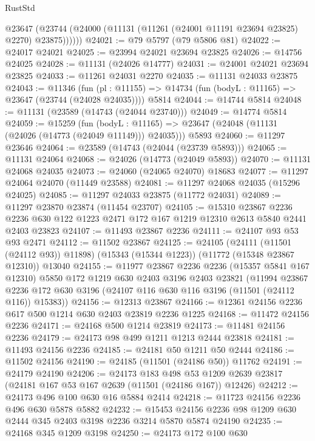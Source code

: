 \begin{lexlean}{RustStd}
\begin{coremodule}
        @23647 (@23744 (@24000 (@11131 (@11261 (@24001 @11191 @23694 @23825) @2270) @23875))))))
@24021 := @79 @5797 (@79 @5806 @81)
@24022 := @24017 @24021
@24025 := @23994 @24021 @23694 @23825
@24026 := @14756 @24025
@24028 := @11131 (@24026 @14777)
@24031 := @24001 @24021 @23694 @23825
@24033 := @11261 @24031 @2270
@24035 := @11131 @24033 @23875
@24043 := @11346
    (fun (pl : @11155) => @14734 (fun (bodyL : @11165) => @23647 (@23744 (@24028 @24035))))
    @5814
@24044 := @14744 @5814
@24048 := @11131 (@23589 (@14743 (@24044 @23740)))
@24049 := @14774 @5814
@24059 := @15259
    (fun (bodyL : @11165) => @23647 (@24048 (@11131 (@24026 (@14773 (@24049 @11149))) @24035)))
    @5893
@24060 := @11297 @23646
@24064 := @23589 (@14743 (@24044 (@23739 @5893)))
@24065 := @11131 @24064
@24068 := @24026 (@14773 (@24049 @5893))
@24070 := @11131 @24068 @24035
@24073 := @24060 (@24065 @24070) @18683
@24077 := @11297 @24064 @24070 (@11449 @23588)
@24081 := @11297 @24068 @24035 (@15296 @24025)
@24085 := @11297 @24033 @23875 (@11772 @24031)
@24089 := @11297 @23870 @23874 (@11454 @23707)
@24105 := @15310
    @23867
    @2236
    @2236
    @630
    @122
    @1223
    @2471
    @172
    @167
    @1219
    @12310
    @2613
    @5840
    @2441
    @2403
    @23823
@24107 := @11493 @23867 @2236
@24111 := @24107 @93 @53 @93 @2471
@24112 := @11502 @23867
@24125 := @24105
    (@24111 (@11501 (@24112 @93)) @11898)
    (@15343 (@15344 @1223))
    (@11772 (@15348 @23867 @12310))
    @13040
@24155 := @11977
    @23867
    @2236
    @2236
    (@15357 @5841 @167 @12310)
    @5850
    @172
    @1219
    @630
    @2403
    @3196
    @2403
    @23821
    (@11994
      @23867
      @2236
      @172
      @630
      @3196
      (@24107 @116 @630 @116 @3196 (@11501 (@24112 @116)) @15383))
@24156 := @12313 @23867
@24166 := @12361 @24156 @2236 @617 @500 @1214 @630 @2403 @23819 @2236 @1225
@24168 := @11472 @24156 @2236
@24171 := @24168 @500 @1214 @23819
@24173 := @11481 @24156 @2236
@24179 := @24173 @98 @499 @1211 @1213 @2444 @23818
@24181 := @11493 @24156 @2236
@24185 := @24181 @50 @1211 @50 @2444
@24186 := @11502 @24156
@24190 := @24185 (@11501 (@24186 @50)) @11762
@24191 := @24179 @24190
@24206 := @24173
    @183
    @498
    @53
    @1209
    @2639
    @23817
    (@24181 @167 @53 @167 @2639 (@11501 (@24186 @167)) @12426)
@24212 := @24173 @496 @100 @630 @16 @5884 @2414
@24218 := @11723 @24156 @2236 @496 @630 @5878 @5882
@24232 := @15453 @24156 @2236 @98 @1209 @630 @2444 @345 @2403 @3198 @2236 @3214 @5870 @5874 @24190
@24235 := @24168 @345 @1209 @3198
@24250 := @24173
    @172
    @100
    @630

\end{coremodule}
\end{lexlean}
